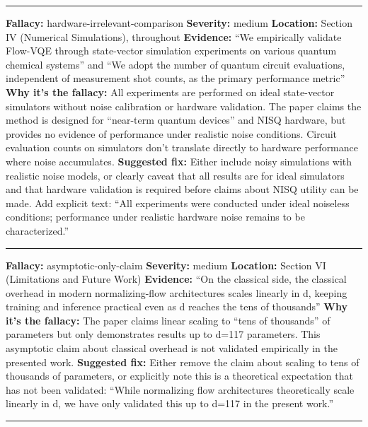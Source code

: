 \documentclass[10pt,letterpaper]{article}
\begin{document}
\begin{center}\rule{0.5\linewidth}{0.5pt}\end{center}

\textbf{Fallacy:} hardware-irrelevant-comparison
\textbf{Severity:} medium
\textbf{Location:} Section IV (Numerical Simulations), throughout
\textbf{Evidence:} ``We empirically validate Flow-VQE through state-vector simulation experiments on various quantum chemical systems'' and ``We adopt the number of quantum circuit evaluations, independent of measurement shot counts, as the primary performance metric''
\textbf{Why it's the fallacy:} All experiments are performed on ideal state-vector simulators without noise calibration or hardware validation. The paper claims the method is designed for ``near-term quantum devices'' and NISQ hardware, but provides no evidence of performance under realistic noise conditions. Circuit evaluation counts on simulators don't translate directly to hardware performance where noise accumulates.
\textbf{Suggested fix:} Either include noisy simulations with realistic noise models, or clearly caveat that all results are for ideal simulators and that hardware validation is required before claims about NISQ utility can be made. Add explicit text: ``All experiments were conducted under ideal noiseless conditions; performance under realistic hardware noise remains to be characterized.''

\begin{center}\rule{0.5\linewidth}{0.5pt}\end{center}

\textbf{Fallacy:} asymptotic-only-claim
\textbf{Severity:} medium
\textbf{Location:} Section VI (Limitations and Future Work)
\textbf{Evidence:} ``On the classical side, the classical overhead in modern normalizing-flow architectures scales linearly in d, keeping training and inference practical even as d reaches the tens of thousands''
\textbf{Why it's the fallacy:} The paper claims linear scaling to ``tens of thousands'' of parameters but only demonstrates results up to d=117 parameters. This asymptotic claim about classical overhead is not validated empirically in the presented work.
\textbf{Suggested fix:} Either remove the claim about scaling to tens of thousands of parameters, or explicitly note this is a theoretical expectation that has not been validated: ``While normalizing flow architectures theoretically scale linearly in d, we have only validated this up to d=117 in the present work.''

\begin{center}\rule{0.5\linewidth}{0.5pt}\end{center}
\end{document}
